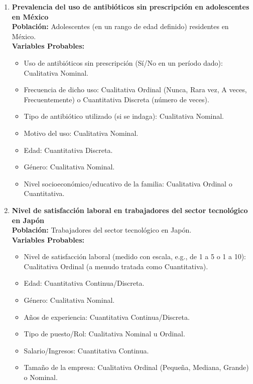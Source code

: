 \documentclass[12pt, letterpaper]{article}
\begin{document}
\begin{enumerate}
\item \textbf{Prevalencia del uso de antibióticos sin prescripción en adolescentes en México} \\
\textbf{Población:} Adolescentes (en un rango de edad definido) residentes en México. \\
\textbf{Variables Probables:}
\begin{itemize}
  \item Uso de antibióticos sin prescripción (Sí/No en un período dado): Cualitativa Nominal.
  \item Frecuencia de dicho uso: Cualitativa Ordinal (Nunca, Rara vez, A veces, Frecuentemente) o Cuantitativa Discreta (número de veces).
  \item Tipo de antibiótico utilizado (si se indaga): Cualitativa Nominal.
  \item Motivo del uso: Cualitativa Nominal.
  \item Edad: Cuantitativa Discreta.
  \item Género: Cualitativa Nominal.
  \item Nivel socioeconómico/educativo de la familia: Cualitativa Ordinal o Cuantitativa.
\end{itemize}

\item \textbf{Nivel de satisfacción laboral en trabajadores del sector tecnológico en Japón} \\
\textbf{Población:} Trabajadores del sector tecnológico en Japón. \\
\textbf{Variables Probables:}
\begin{itemize}
  \item Nivel de satisfacción laboral (medido con escala, e.g., de 1 a 5 o 1 a 10): Cualitativa Ordinal (a menudo tratada como Cuantitativa).
  \item Edad: Cuantitativa Continua/Discreta.
  \item Género: Cualitativa Nominal.
  \item Años de experiencia: Cuantitativa Continua/Discreta.
  \item Tipo de puesto/Rol: Cualitativa Nominal u Ordinal.
  \item Salario/Ingresos: Cuantitativa Continua.
  \item Tamaño de la empresa: Cualitativa Ordinal (Pequeña, Mediana, Grande) o Nominal.
\end{itemize}


\end{enumerate}
\end{document}
